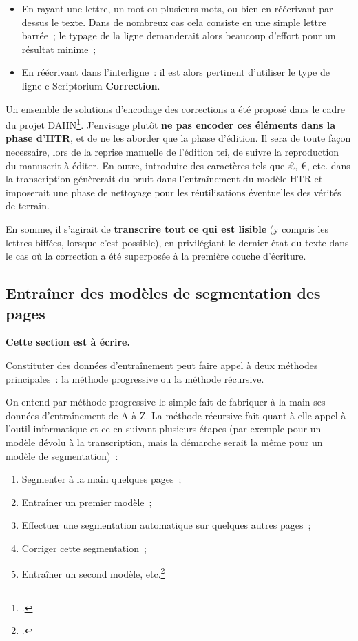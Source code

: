 \documentclass[a4paper,12pt,twoside]{book}
\begin{document}
				\begin{itemize}
					\item En rayant une lettre, un mot ou plusieurs mots, ou bien en réécrivant par dessus le texte. Dans de nombreux cas cela consiste en une simple lettre barrée~; le typage de la ligne demanderait alors beaucoup d'effort pour un résultat minime~;
					\item En réécrivant dans l'interligne~: il est alors pertinent d'utiliser le type de ligne e-Scriptorium \textbf{Correction}.
				\end{itemize}
				
				Un ensemble de solutions d'encodage des corrections a été proposé dans le cadre du projet DAHN\footcite{chiffoleauFewTipsReading}. J'envisage plutôt \textbf{ne pas encoder ces éléments dans la phase d'HTR}, et de ne les aborder que la phase d'édition. Il sera de toute façon necessaire, lors de la reprise manuelle de l'édition \gls{tei}, de suivre la reproduction du manuscrit à éditer. En outre, introduire des caractères tels que £, €, etc. dans la transcription génèrerait du bruit dans l'entraînement du modèle HTR et imposerait une phase de nettoyage pour les réutilisations éventuelles des vérités de terrain.
				
				En somme, il s'agirait de \textbf{transcrire tout ce qui est lisible} (y compris les lettres biffées, lorsque c'est possible), en privilégiant le dernier état du texte dans le cas où la correction a été superposée à la première couche d'écriture.
		
			\subsection{Entraîner des modèles de segmentation des pages}
	    		\textbf{Cette section est à écrire.}
	    		
	    		\label{recursive}
	    		Constituter des données d'entraînement peut faire appel à deux méthodes principales~: la méthode progressive ou la méthode récursive.
	    		
	    		On entend par méthode progressive le simple fait de fabriquer à la main ses données d'entraînement de A à Z. La méthode récursive fait quant à elle appel à l'outil informatique et ce en suivant plusieurs étapes (par exemple pour un modèle dévolu à la transcription, mais la démarche serait la même pour un modèle de \gls{segmentation})~:
	    		
	    		\begin{enumerate}
	    			\item Segmenter à la main quelques pages~;
	    			\item Entraîner un premier modèle~;
	    			\item Effectuer une \gls{segmentation} automatique sur quelques autres pages~;
	    			\item Corriger cette \gls{segmentation}~;
	    			\item Entraîner un second modèle, etc.\footcite{stokesEScriptoriumVREManuscript2021}
	    		\end{enumerate}
    			
\end{document}
